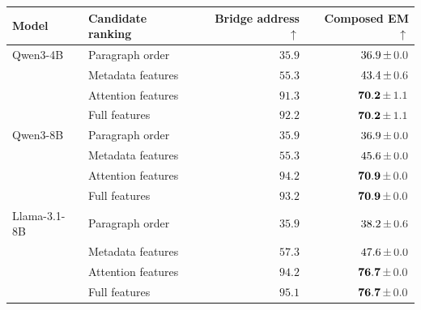 \begingroup\renewcommand{\arraystretch}{1.08}
\begin{tabular}{llrr}
\toprule
\textbf{Model} & \textbf{Candidate ranking} & \textbf{Bridge address $\uparrow$} & \textbf{Composed EM $\uparrow$} \\
\midrule
\rowcolor{tablebase}Qwen3-4B & Paragraph order & $35.9$ & $36.9{\color{black!80}\,\pm\,0.0}$ \\
 & Metadata features & $55.3$ & $43.4{\color{black!80}\,\pm\,0.6}$ \\
 & Attention features & $91.3$ & $\mathbf{70.2}{\color{black!80}\,\pm\,1.1}$ \\
\rowcolor{tableours} & Full features & $\mathbf{92.2}$ & $\mathbf{70.2}{\color{black!80}\,\pm\,1.1}$ \\
\midrule
\rowcolor{tablebase}Qwen3-8B & Paragraph order & $35.9$ & $36.9{\color{black!80}\,\pm\,0.0}$ \\
 & Metadata features & $55.3$ & $45.6{\color{black!80}\,\pm\,0.0}$ \\
 & Attention features & $\mathbf{94.2}$ & $\mathbf{70.9}{\color{black!80}\,\pm\,0.0}$ \\
\rowcolor{tableours} & Full features & $93.2$ & $\mathbf{70.9}{\color{black!80}\,\pm\,0.0}$ \\
\midrule
\rowcolor{tablebase}Llama-3.1-8B & Paragraph order & $35.9$ & $38.2{\color{black!80}\,\pm\,0.6}$ \\
 & Metadata features & $57.3$ & $47.6{\color{black!80}\,\pm\,0.0}$ \\
 & Attention features & $94.2$ & $\mathbf{76.7}{\color{black!80}\,\pm\,0.0}$ \\
\rowcolor{tableours} & Full features & $\mathbf{95.1}$ & $\mathbf{76.7}{\color{black!80}\,\pm\,0.0}$ \\
\bottomrule
\end{tabular}
\endgroup
